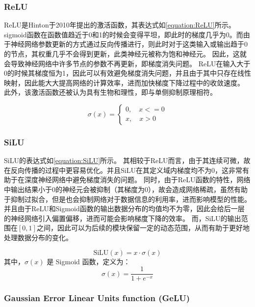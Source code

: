 \subsubsection{ReLU}

ReLU是Hinton于2010年提出的激活函数\cite{2010ReLU}，其表达式如\cref{equation:ReLU}所示。
sigmoid函数在函数值趋近于0和1的时候会变得平坦，即此时的梯度几乎为0。而由于神经网络参数更新的方式通过反向传播进行，则此时对于这类输入或输出趋于0的节点，其权重几乎不会得到更新，此类神经元被称为饱和神经元。
因此，这就会导致神经网络中许多节点的参数不再更新，即梯度消失问题。
ReLU在输入大于0的时候其梯度恒为1，因此可以有效避免梯度消失问题，并且由于其中只存在线性映射，因此能大大提高网络的计算效率，进而加快梯度下降过程中的收敛速度。
此外，该激活函数还被认为具有生物和理性，即与单侧抑制原理相符。

  \begin{equation}
    \label{equation:ReLU}
    \sigma(x) = 
    \left\{
    \begin{aligned}
      0, \quad x <= 0 \\
      x, \quad x > 0
    \end{aligned}
    \right.
    \end{equation}

    \subsubsection{SiLU}
  
    SiLU的表达式如\cref{equation:SiLU}所示。
    其相较于ReLU而言，由于其连续可微，故在反向传播的过程中更容易优化。并且SiLU在其定义域内梯度均不为0，这非常有助于在深度神经网络中避免梯度消失的问题。
    同时，由于ReLU函数的特性，网络中输出结果小于0的神经元会被抑制（其梯度为0），故会造成网络稀疏，虽然有助于抑制过拟合，但是也会抑制网络对于数据信息的利用率，进而影响模型的性能。
    并且由于ReLU和Sigmoid函数的输出数据分布的均值均不为零，因此会给后一层的神经网络引入偏置偏移，进而可能会影响梯度下降的效率。
    而，SiLU的输出范围在$[0, 1]$之间，因此可以为后续的模块保留一定的动态范围，从而有助于更好地处理数据分布的变化。

    \begin{equation}
      \label{equation:SiLU}
      \text{SiLU}(x) = x \cdot \sigma(x)
    \end{equation}
  其中，$\sigma(x)$ 是 Sigmoid 函数，定义为：
  \begin{equation}
    \sigma(x) = \frac{1}{1 + e^{-x}}
  \end{equation}
  
  \subsubsection{Gaussian Error Linear Units function (GeLU)}
  
